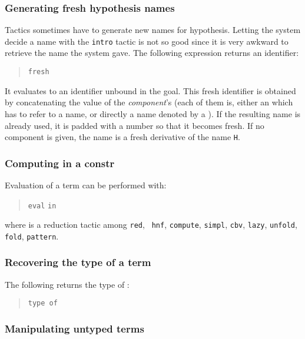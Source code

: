 \subsubsection[Generating fresh hypothesis names]{Generating fresh hypothesis names
}

Tactics sometimes have to generate new names for hypothesis. Letting
the system decide a name with the {\tt intro} tactic is not so good
since it is very awkward to retrieve the name the system gave.
The following expression returns an identifier:
\begin{quote}
{\tt fresh} 
\end{quote}
It evaluates to an identifier unbound in the goal. This fresh
identifier is obtained by concatenating the value of the
\textrm{\textsl{component}}'s (each of them is, either an {\ident} which
has to refer to a name, or directly a name denoted by a
{\qstring}). If the resulting name is already used, it is padded
with a number so that it becomes fresh. If no component is
given, the name is a fresh derivative of the name {\tt H}.

\subsubsection[Computing in a constr]{Computing in a constr
}

Evaluation of a term can be performed with:
\begin{quote}
{\tt eval} {} {\tt in} {\term}
\end{quote}
where  is a reduction tactic among {\tt red}, {\tt
hnf}, {\tt compute}, {\tt simpl}, {\tt cbv}, {\tt lazy}, {\tt unfold},
{\tt fold}, {\tt pattern}.

\subsubsection{Recovering the type of a term}

The following returns the type of {\term}:

\begin{quote}
{\tt type of} {\term}
\end{quote}

\subsubsection[Manipulating untyped terms]{Manipulating untyped terms}


